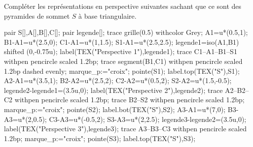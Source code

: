 \begin{exercice*}
    Compléter les représentations en perspective suivantes sachant que ce sont des pyramides de sommet $S$ à base triangulaire.

    \begin{Geometrie}[CoinHD={u*(10,5)}]
        pair S[],A[],B[],C[];
        pair legende[];
        trace grille(0.5) withcolor Grey;
        A1=u*(0.5,1);
        B1-A1=u*(2.5,0);
        C1-A1=u*(1,1.5);
        S1-A1=u*(2.5,2.5);
        legende1=iso(A1,B1) shifted (0,-0.75u);
        label(TEX("Perspective 1"),legende1);
        trace C1--A1--B1--S1 withpen pencircle scaled 1.2bp;
        trace segment(B1,C1) withpen pencircle scaled 1.2bp dashed evenly;
        marque_p:="croix";
        pointe(S1);
        label.top(TEX("S"),S1);
        A2-A1=u*(3.5,1);
        B2-A2=u*(2.5,2);
        C2-A2=u*(0.5,2);
        S2-A2=u*(1.5,-0.5);
        legende2-legende1=(3.5u,0);
        label(TEX("Perspective 2"),legende2);
        trace A2--B2--C2 withpen pencircle scaled 1.2bp;
        trace B2--S2 withpen pencircle scaled 1.2bp;
        marque_p:="croix";        
        pointe(S2);
        label.bot(TEX("S"),S2);
        A3-A1=u*(7,0);
        B3-A3=u*(2,0.5);
        C3-A3=u*(-0.5,2);
        S3-A3=u*(2,2.5);
        legende3-legende2=(3.5u,0);
        label(TEX("Perspective 3"),legende3);
        trace A3--B3--C3 withpen pencircle scaled 1.2bp;        
        marque_p:="croix";        
        pointe(S3);
        label.top(TEX("S"),S3);
    \end{Geometrie}
\end{exercice*}
